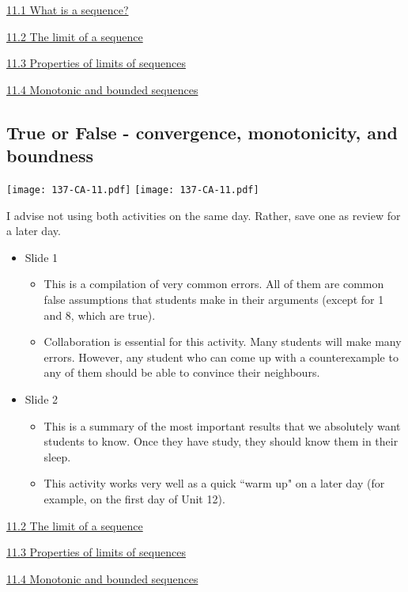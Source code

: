 \documentclass[11pt]{article}
\newcommand{\nl}{\hfill \vspace{-1.1\baselineskip}} %
\newcommand{\vi}{\hspace{8mm} \href{https://www.youtube.com/watch?v=utfrtw-H9-Q&list=PLlwePzQY_wW_yFyXauToZNFNhhufzioP2}{11.1 What is a sequence?}}
\newcommand{\vii}{\hspace{8mm} \href{https://www.youtube.com/watch?v=Dr8LzBA-H84&list=PLlwePzQY_wW_yFyXauToZNFNhhufzioP2&index=2}{11.2 The limit of a sequence}}
\newcommand{\viii}{\hspace{8mm} \href{https://www.youtube.com/watch?v=xuNRMkzSzZY&list=PLlwePzQY_wW_yFyXauToZNFNhhufzioP2&index=3}{11.3 Properties of limits of sequences}}
\newcommand{\viv}{\hspace{8mm} \href{https://www.youtube.com/watch?v=J8uZJ9by0ys&list=PLlwePzQY_wW_yFyXauToZNFNhhufzioP2&index=4}{11.4 Monotonic and bounded sequences}}
\begin{document}
\begin{videos}
\vi

\vii

\viii

\viv

\end{videos}

\newpage
\subsection{True or False - convergence, monotonicity, and boundness}

\begin{center}
{ \texttt{[image: 137-CA-11.pdf]}} \quad
{ \texttt{[image: 137-CA-11.pdf]}} 
\end{center}

\begin{warning}
	I advise not using both activities on the same day.  Rather, save one as review for a later day.
\end{warning}

\begin{comments}
\nl
	\begin{itemize}
		\item Slide 1 
			\begin{itemize}
				\item This is a compilation of very common errors.  All of them are common false assumptions that students make in their arguments (except for 1 and 8, which are true).
				\item Collaboration is essential for this activity.  Many students will make many errors.  However, any student who can come up with a counterexample to any of them should be able to convince their neighbours.
			\end{itemize}
		\item Slide 2
			\begin{itemize}
				\item This is a summary of the most important results that we absolutely want students to know.  Once they have study, they should know them in their sleep.
				\item This activity works very well as a quick ``warm up" on a later day (for example, on the first day of Unit 12).
			\end{itemize}
	\end{itemize}
\end{comments}

\begin{videos}
\vii

\viii

\viv
\end{videos}
\end{document}
